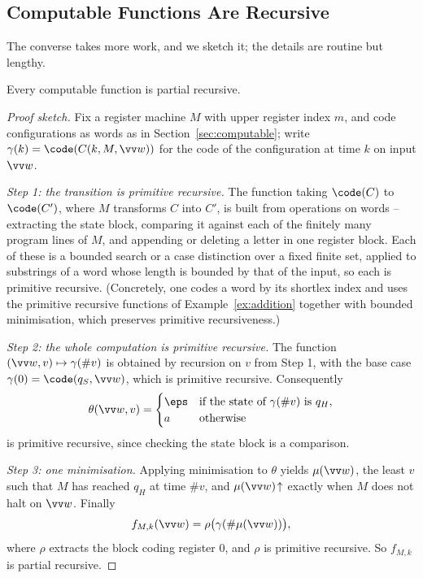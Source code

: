 \subsection{Computable Functions Are Recursive}

The converse takes more work, and we sketch it; the details are routine but lengthy.

\begin{theorem}\label{thm:computablerecursive}
	Every computable function is partial recursive.
\end{theorem}

\begin{proof}[Proof sketch]
	Fix a register machine $M$ with upper register index $m$, and code configurations as words as in Section~\ref{sec:computable}; write $\gamma(k) = \code(C(k,M,\vv w))$ for the code of the configuration at time $k$ on input $\vv w$.

	\emph{Step 1: the transition is primitive recursive.} The function taking $\code(C)$ to $\code(C')$, where $M$ transforms $C$ into $C'$, is built from operations on words -- extracting the state block, comparing it against each of the finitely many program lines of $M$, and appending or deleting a letter in one register block. Each of these is a bounded search or a case distinction over a fixed finite set, applied to substrings of a word whose length is bounded by that of the input, so each is primitive recursive. (Concretely, one codes a word by its shortlex index and uses the primitive recursive functions of Example~\ref{ex:addition} together with bounded minimisation, which preserves primitive recursiveness.)

	\emph{Step 2: the whole computation is primitive recursive.} The function $(\vv w, v) \mapsto \gamma(\#v)$ is obtained by recursion on $v$ from Step 1, with the base case $\gamma(0) = \code(q_S,\vv w)$, which is primitive recursive. Consequently
	$$\theta(\vv w, v) = \begin{cases}\eps & \text{if the state of } \gamma(\#v) \text{ is } q_H, \\ a & \text{otherwise}\end{cases}$$
	is primitive recursive, since checking the state block is a comparison.

	\emph{Step 3: one minimisation.} Applying minimisation to $\theta$ yields $\mu(\vv w)$, the least $v$ such that $M$ has reached $q_H$ at time $\#v$, and $\mu(\vv w)\!\uparrow$ exactly when $M$ does not halt on $\vv w$. Finally
	$$f_{M,k}(\vv w) = \rho\big(\gamma(\#\mu(\vv w))\big),$$
	where $\rho$ extracts the block coding register $0$, and $\rho$ is primitive recursive. So $f_{M,k}$ is partial recursive.
\end{proof}


